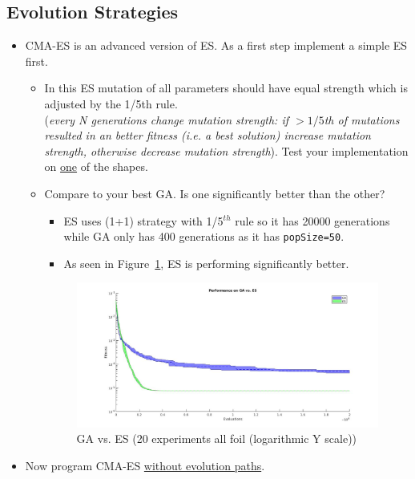 \documentclass{article}
\begin{document}
\newpage
\subsection{Evolution Strategies}
\begin{itemize}
	\item CMA-ES is an advanced version of ES. As a first step implement a simple ES first. 
		\begin{itemize}
			\item In this ES mutation of all parameters should have equal strength which is adjusted by the 1/5th rule.\\(\textit{every N generations change mutation strength: if $>1/5$th of mutations resulted in an better fitness (i.e. a best solution) increase mutation strength, otherwise decrease mutation strength}). Test your implementation on \underline{one} of the shapes.
			\item Compare to your best GA. Is one significantly better than the other?
			\color{blue}
            \begin{itemize}
                \item ES uses (1+1) strategy with 1/5$^{th}$ rule so it has 20000 generations while GA only has 400 generations as it has \texttt{popSize=50}.
                \item As seen in Figure~\ref{fig:5}, ES is performing significantly better.
            \end{itemize}
            \color{black}
        \begin{figure}[ht!]
            \centering
            \includegraphics[width=1.0\linewidth]{ga_es_20exp_3foil.jpg}
            \caption{GA vs. ES (20 experiments all foil (logarithmic Y scale))\label{fig:5}}
        \end{figure}
		\end{itemize}
        \newpage
	\item Now program CMA-ES \underline{without evolution paths}.

\end{itemize}
\end{document}

